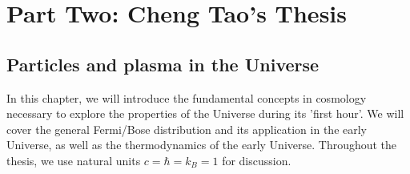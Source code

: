 \section{Part Two: Cheng Tao's Thesis}\label{part2}
\subsection{Particles and plasma in the Universe} \label{Introduction}
In this chapter, we will introduce the fundamental concepts in cosmology necessary to explore the properties of the Universe during its 'first hour'. We will cover the general Fermi/Bose distribution and its application in the early Universe, as well as the thermodynamics of the early Universe. Throughout the thesis, we use natural units $c=\hbar=k_{B}=1$ for discussion.






